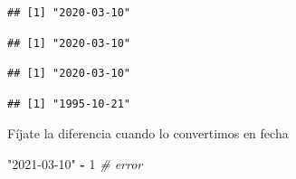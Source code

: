 \documentclass[11pt,]{book}
\newenvironment{Shaded}{\begin{snugshade}}{\end{snugshade}}
\newcommand{\CommentTok}[1]{\textcolor[rgb]{0.37,0.37,0.37}{\textit{#1}}}
\newcommand{\DecValTok}[1]{\textcolor[rgb]{0.06,0.06,0.06}{#1}}
\newcommand{\KeywordTok}[1]{\textcolor[rgb]{0.27,0.27,0.27}{\textbf{#1}}}
\newcommand{\NormalTok}[1]{#1}
\newcommand{\OperatorTok}[1]{\textcolor[rgb]{0.43,0.43,0.43}{\textbf{#1}}}
\newcommand{\StringTok}[1]{\textcolor[rgb]{0.5,0.5,0.5}{#1}}
\begin{document}
\begin{Shaded}
\end{Shaded}

\begin{verbatim}
## [1] "2020-03-10"
\end{verbatim}

\begin{Shaded}
\end{Shaded}

\begin{verbatim}
## [1] "2020-03-10"
\end{verbatim}

\begin{Shaded}
\end{Shaded}

\begin{verbatim}
## [1] "2020-03-10"
\end{verbatim}

\begin{Shaded}
\end{Shaded}

\begin{verbatim}
## [1] "1995-10-21"
\end{verbatim}

Fíjate la diferencia cuando lo convertimos en fecha

\begin{Shaded}
\begin{Highlighting}[]
\StringTok{"2021-03-10"} \OperatorTok{-}\StringTok{ }\DecValTok{1} \CommentTok{# error}
\end{Highlighting}
\end{Shaded}
\end{document}
